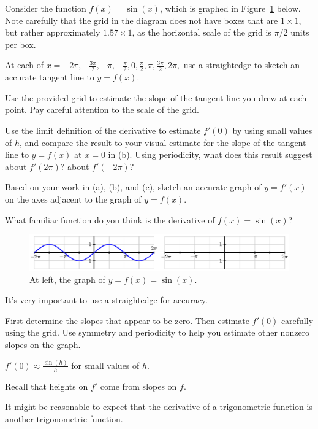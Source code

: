 \begin{activity} \label{A:2.2.1}  Consider the function $f(x) = \sin(x)$, which is graphed in Figure~\ref{F:2.2.A1} below.  Note carefully that the grid in the diagram does not have boxes that are $1 \times 1$, but rather approximately $1.57 \times 1$, as the horizontal scale of the grid is $\pi/2$ units per box.
\ba
	\item At each of $x = -2\pi, -\frac{3\pi}{2}, -\pi, -\frac{\pi}{2}, 0, \frac{\pi}{2}, \pi, \frac{3\pi}{2}, 2\pi,$ use a straightedge to sketch an accurate tangent line to $y = f(x)$.
	\item Use the provided grid to estimate the slope of the tangent line you drew at each point.  Pay careful attention to the scale of the grid.
	\item Use the limit definition of the derivative to estimate $f'(0)$ by using small values of $h$, and compare the result to your visual estimate for the slope of the tangent line to $y = f(x)$ at $x = 0$ in (b).  Using periodicity, what does this result suggest about $f'(2\pi)$?  about $f'(-2\pi)$?  
	\item Based on your work in (a), (b), and (c), sketch an accurate graph of $y = f'(x)$ on the axes adjacent to the graph of $y = f(x)$.
	\item What familiar function do you think is the derivative of $f(x) = \sin(x)$?
\ea
\begin{figure}[h]
\begin{center}
\includegraphics{figures/2_2_sine.eps}
\caption{At left, the graph of $y = f(x) = \sin(x)$.} \label{F:2.2.A1}
\end{center}
\end{figure}

\end{activity}
\begin{smallhint}
\ba
	\item It's very important to use a straightedge for accuracy.
	\item First determine the slopes that appear to be zero.  Then estimate $f'(0)$ carefully using the grid.  Use symmetry and periodicity to help you estimate other nonzero slopes on the graph.
	\item $f'(0) \approx \frac{\sin(h)}{h}$ for small values of $h$. 
	\item Recall that heights on $f'$ come from slopes on $f$.
	\item It might be reasonable to expect that the derivative of a trigonometric function is another trigonometric function.
\ea
\end{smallhint}
